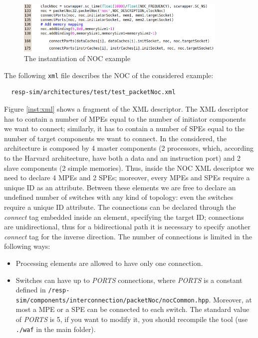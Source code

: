 \documentclass[a4paper,11pt,oneside]{article}
\begin{document}
\begin{figure}[htbp]
\begin{center}
  \includegraphics[width=0.9\textwidth]{instantiation}
\end{center}
\caption{The instantiation of NOC  example}
\label{inst:code}
\end{figure}

The following \texttt{xml} file describes the NOC of the considered example:
\begin{verbatim}
  resp-sim/architectures/test/test_packetNoc.xml
\end{verbatim}
Figure \ref{inst:xml} shows a fragment of the XML descriptor.
The XML descriptor has to contain a number of MPEs equal to the number of initiator components we want to connect; similarly, it has to contain a number of SPEs equal to the number of target components we want to connect. 
In the considered, the architecture is composed by 4 master components (2 processors, which, according to the Harvard architecture, have both a data and an instruction port) and 2 slave components (2 simple memories). Thus, inside the NOC XML descriptor we need to declare 4 MPEs and 2 SPEs; moreover, every MPEs and SPEs require a unique ID as an attribute. 
Between these elements we are free to declare an undefined number of switches with any kind of topology: even the switches require a unique ID attribute. The connections can be declared through the \textit{connect} tag embedded inside an element, specifying the target ID; connections are unidirectional, thus for a bidirectional path it is necessary to specify another 
\textit{connect} tag for the inverse direction. The number of connections is limited in the following ways:
\begin{itemize}
  \item Processing elements are allowed to have only one connection.
  \item Switches can have up to \textit{PORTS} connections, where \textit{PORTS} is a constant defined in \texttt{/resp-sim/components/interconnection/\linebreak packetNoc/nocCommon.hpp}. Moreover, at most a MPE or a SPE can be connected to each switch. The standard value of \textit{PORTS} is 5, if you want to modify it, you should recompile the tool (use \texttt{./waf} in the main folder).

\end{itemize}
\end{document}
